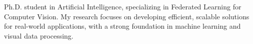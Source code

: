 %
%
%
\par{
    Ph.D. student in Artificial Intelligence, specializing in Federated Learning for Computer Vision. My research focuses on developing efficient, scalable solutions for real-world applications, with a strong foundation in machine learning and visual data processing.}